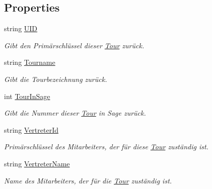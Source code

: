\subsection*{Properties}
\begin{DoxyCompactItemize}
\item 
string \hyperlink{class_products_1_1_model_1_1_entities_1_1_tour_a60d7092a6547742aec97548b2550ea09}{U\+ID}
\begin{DoxyCompactList}\small\item\em Gibt den Primärschlüssel dieser \hyperlink{class_products_1_1_model_1_1_entities_1_1_tour}{Tour} zurück. \end{DoxyCompactList}\item 
string \hyperlink{class_products_1_1_model_1_1_entities_1_1_tour_a6ebcf3f9df624c625c380a813239be79}{Tourname}
\begin{DoxyCompactList}\small\item\em Gibt die Tourbezeichnung zurück. \end{DoxyCompactList}\item 
int \hyperlink{class_products_1_1_model_1_1_entities_1_1_tour_aeeeceef7a6105ab575633ff3b0e730aa}{Tour\+In\+Sage}
\begin{DoxyCompactList}\small\item\em Gibt die Nummer dieser \hyperlink{class_products_1_1_model_1_1_entities_1_1_tour}{Tour} in Sage zurück. \end{DoxyCompactList}\item 
string \hyperlink{class_products_1_1_model_1_1_entities_1_1_tour_ae59a9753e62275238c29e72e2063ff4a}{Vertreter\+Id}
\begin{DoxyCompactList}\small\item\em Primärschlüssel des Mitarbeiters, der für diese \hyperlink{class_products_1_1_model_1_1_entities_1_1_tour}{Tour} zuständig ist. \end{DoxyCompactList}\item 
string \hyperlink{class_products_1_1_model_1_1_entities_1_1_tour_a81eaded03434281b82187cae3047454c}{Vertreter\+Name}
\begin{DoxyCompactList}\small\item\em Name des Mitarbeiters, der für die \hyperlink{class_products_1_1_model_1_1_entities_1_1_tour}{Tour} zuständig ist. \end{DoxyCompactList}\item 

\end{DoxyCompactItemize}
